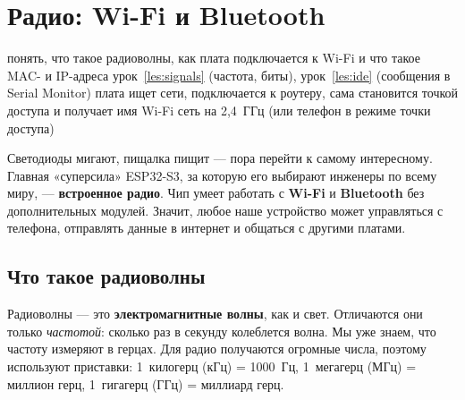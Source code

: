 \section{Радио: Wi-Fi и Bluetooth}
\label{les:radio}
\lessonintro
  {понять, что такое радиоволны, как плата подключается к Wi-Fi и что такое MAC- и IP-адреса}
  {урок~\ref{les:signals} (частота, биты), урок~\ref{les:ide} (сообщения в Serial Monitor)}
  {плата ищет сети, подключается к роутеру, сама становится точкой доступа и получает имя }
  {Wi-Fi сеть на 2,4~ГГц (или телефон в режиме точки доступа)}

Светодиоды мигают, пищалка пищит --- пора перейти к самому интересному. Главная «суперсила» ESP32-S3,
за которую его выбирают инженеры по всему миру, --- \textbf{встроенное радио}. Чип умеет работать
с \textbf{Wi-Fi} и \textbf{Bluetooth} без дополнительных модулей. Значит, любое наше устройство может
управляться с телефона, отправлять данные в интернет и общаться с другими платами.

\subsection{Что такое радиоволны}

Радиоволны --- это \textbf{электромагнитные волны}, как и свет. Отличаются они только
\emph{частотой}: сколько раз в секунду колеблется волна. Мы уже знаем, что частоту измеряют в герцах.
Для радио получаются огромные числа, поэтому используют приставки:
1~килогерц (кГц) = 1000~Гц, 1~мегагерц (МГц) = миллион герц, 1~гигагерц (ГГц) = миллиард герц.

